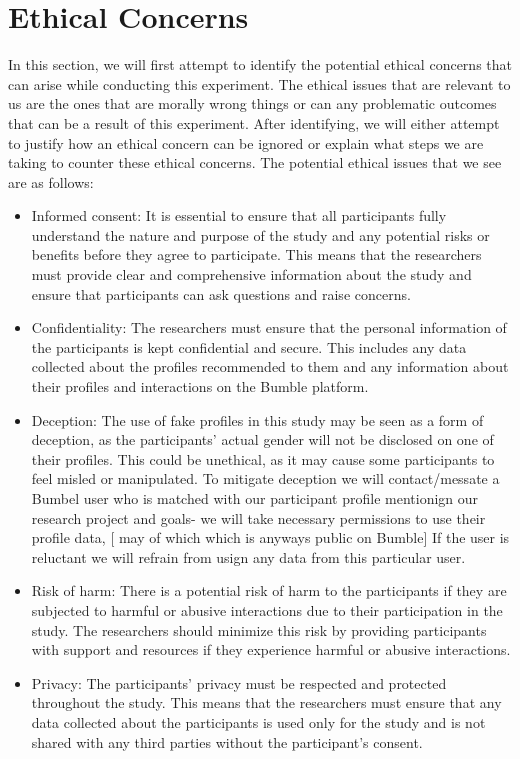 \section{Ethical Concerns}
In this section, we will first attempt to identify the potential ethical concerns that can arise while conducting this experiment. The ethical issues that are relevant to us are the ones that are morally wrong things or can any problematic outcomes that can be a result of this experiment. After identifying, we will either attempt to justify how an ethical concern can be ignored or explain what steps we are taking to counter these ethical concerns. The potential ethical issues that we see are as follows:
\begin{itemize}
	\item Informed consent: It is essential to ensure that all participants fully understand the nature and purpose of the study and any potential risks or benefits before they agree to participate. This means that the researchers must provide clear and comprehensive information about the study and ensure that participants can ask questions and raise concerns.
	\item Confidentiality: The researchers must ensure that the personal information of the participants is kept confidential and secure. This includes any data collected about the profiles recommended to them and any information about their profiles and interactions on the Bumble platform.
	\item Deception: The use of fake profiles in this study may be seen as a form of deception, as the participants' actual gender will not be disclosed on one of their profiles. This could be unethical, as it may cause some participants to feel misled or manipulated. To mitigate deception we will contact/messate a Bumbel user who is matched with our participant profile mentionign our research project and goals- we will take necessary permissions to use their profile data, [ may of which which is anyways public on Bumble] If the user is reluctant we will refrain from usign any data from this particular user.
	\item Risk of harm: There is a potential risk of harm to the participants if they are subjected to harmful or abusive interactions due to their participation in the study. The researchers should minimize this risk by providing participants with support and resources if they experience harmful or abusive interactions.
	\item Privacy: The participants' privacy must be respected and protected throughout the study. This means that the researchers must ensure that any data collected about the participants is used only for the study and is not shared with any third parties without the participant's consent.
\end{itemize}

